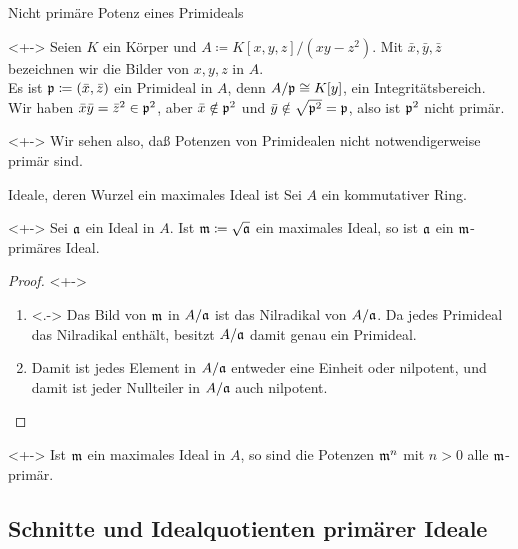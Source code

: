 \begin{frame}{Nicht primäre Potenz eines Primideals}
	\begin{example}<+->
		Seien \(K\) ein Körper und \(A \coloneqq K[x, y, z]/(xy - z^2)\). Mit \(\bar x, \bar y, \bar z\) bezeichnen wir die
		Bilder von \(x, y, z\) in \(A\).
		\\
		Es ist \(\mathfrak{p} \coloneqq (\bar x, \bar z)\) ein Primideal in \(A\), denn \(A/\mathfrak{p} \cong K[y]\), ein Integritätsbereich.
		\\
		Wir haben \(\bar x \bar y = \bar z^2 \in \mathfrak{p}^2\), aber \(\bar x \notin \mathfrak{p}^2\) und \(\bar y \notin \sqrt{\mathfrak{p}^2}
		= \mathfrak{p}\), also ist \(\mathfrak{p}^2\) nicht primär.
	\end{example}
	\begin{visibleenv}<+->
		Wir sehen also, daß Potenzen von Primidealen nicht notwendigerweise primär sind.
	\end{visibleenv}
\end{frame}

\begin{frame}{Ideale, deren Wurzel ein maximales Ideal ist}
	Sei \(A\) ein kommutativer Ring.
	\begin{proposition}<+->
		Sei \(\mathfrak{a}\) ein Ideal in \(A\). Ist \(\mathfrak{m} \coloneqq \sqrt{\mathfrak{a}}\) ein maximales Ideal, so ist \(\mathfrak{a}\) ein
		\(\mathfrak{m}\)-primäres
		Ideal.
	\end{proposition}
	\begin{proof}<+->
		\begin{enumerate}[<+->]
		\item<.->
			Das Bild von \(\mathfrak{m}\) in \(A/\mathfrak{a}\) ist das Nilradikal von \(A/\mathfrak{a}\). Da jedes Primideal das Nilradikal enthält,
			besitzt \(A/\mathfrak{a}\) damit genau ein Primideal.
		\item
			Damit ist jedes Element in \(A/\mathfrak{a}\) entweder eine Einheit oder nilpotent, und damit ist jeder Nullteiler in
			\(A/\mathfrak{a}\) auch nilpotent.
			\qedhere
		\end{enumerate}
	\end{proof}
	\begin{example}<+->
		Ist \(\mathfrak{m}\) ein maximales Ideal in \(A\), so sind die Potenzen \(\mathfrak{m}^n\) mit \(n > 0\) alle \(\mathfrak{m}\)-primär.
	\end{example}
\end{frame}

\subsection{Schnitte und Idealquotienten primärer Ideale}

